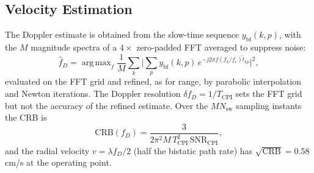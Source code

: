 \documentclass[journal]{IEEEtran}
\DeclareMathOperator*{\argmax}{arg\,max}
\begin{document}
\subsection{Velocity Estimation}
\label{sec:vel_est}
The Doppler estimate is obtained from the slow-time sequence $y_{\mathrm{bf}}(k,p)$, with the $M$ magnitude spectra of a $4\times$ zero-padded FFT averaged to suppress noise:
\begin{equation}
\hat{f}_D = \argmax_f \frac{1}{M}\sum_k
\Big|\sum_{p} y_{\mathrm{bf}}(k,p)\,e^{-j2\pi f (f_k/f_c)\tilde t_{kp}}\Big|^2,
\label{eq:fd_est}
\end{equation}
evaluated on the FFT grid and refined, as for range, by parabolic interpolation and Newton iterations. The Doppler resolution $\delta f_D = 1/T_{\mathrm{CPI}}$ sets the FFT grid but not the accuracy of the refined estimate. Over the $MN_{\mathrm{sw}}$ sampling instants the CRB is~\cite{harris1978use,steven1993fundamentals, willis2005bistatic}
\begin{equation}
\mathrm{CRB}(f_D) = \frac{3}{2\pi^2 M\,T_{\mathrm{CPI}}^2\, \mathrm{SNR}_{\mathrm{CPI}}},
\label{eq:crb_fd}
\end{equation}
and the radial velocity $v = \lambda f_D/2$ (half the bistatic path rate) has $\sqrt{\mathrm{CRB}} = 0.58$\,cm/s at the operating point.
\end{document}
